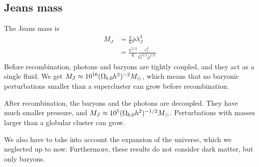 
\subsection*{Jeans mass}
The Jeans mass is
\begin{align*}
	M_J
	&= \frac{\pi}{6} \bar{\rho} \lambda_J^3\\
	&= \frac{\pi^{5/2}}{6} \frac{c_s^3}{G^{3/2} \bar{\rho}^{1/2}}
\end{align*}
Before recombination, photons and baryons are tightly coupled, and they act as a single fluid. We get $M_J \approx \num{e16} (\Omega_{b,0}h^2)^{-2} M_\odot$, which means that no baryonic perturbations smaller than a supercluster can grow before recombination.

After recombination, the baryons and the photons are decoupled. They have much smaller pressure, and $M_J \approx \num{e5} (\Omega_{b,0}h^2)^{-1/2} M_\odot$. Perturbations with masses larger than a globular cluster can grow.

We also have to take into account the expansion of the universe, which we neglected up to now. Furthermore, these results do not consider dark matter, but only baryons.


